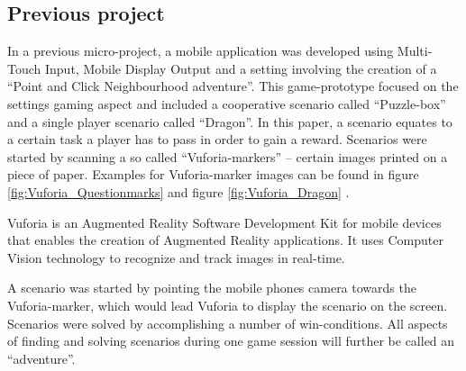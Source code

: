 \documentclass{sigchi-ext}
\begin{document}
\subsection{Previous project}
In a previous micro-project, a mobile application was developed using Multi-Touch Input, Mobile Display Output and a setting involving the creation of a ``Point and Click Neighbourhood adventure''. This game-prototype focused on the settings gaming aspect and included a cooperative scenario called ``Puzzle-box'' and a single player scenario called ``Dragon''. In this paper, a scenario equates to a certain task a player has to pass in order to gain a reward. Scenarios were started by scanning a so called ``Vuforia-markers'' -- certain images printed on a piece of paper. Examples for Vuforia-marker images can be found in figure \ref{fig:Vuforia_Questionmarks} \cite{puzzleBoxMarker} and figure \ref{fig:Vuforia_Dragon} \cite{dragonMarker}.

Vuforia is an Augmented Reality Software Development Kit for mobile devices that enables the creation of Augmented Reality applications. It uses Computer Vision technology to recognize and track images in real-time. \cite{vuforiaExplanation}

A scenario was started by pointing the mobile phones camera towards the Vuforia-marker, which would lead Vuforia to display the scenario on the screen. Scenarios were solved by accomplishing a number of win-conditions. All aspects of finding and solving scenarios during one game session will further be called an ``adventure''. 
\end{document}
